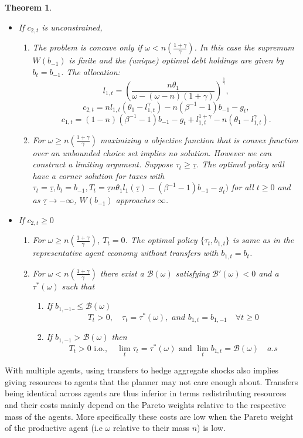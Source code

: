 \documentclass[thmsb,11pt]{article}
\newtheorem{theorem}{Theorem}
\begin{document}
\begin{theorem}
\begin{itemize}
\item If $c_{2,t}$ is unconstrained, 
\begin{enumerate}

\item The problem is concave only if $\omega<n \left(\frac{1+\gamma}{\gamma}\right)$. In this case the supremum $W(b_{-1})$ is finite and the (unique) optimal debt holdings are given by $b_{t}=b_{-1}$. The allocation:
\[l_{1,t}=\left(\frac{n\theta_1}{\omega-(\omega-n)(1+\gamma)}\right)^{\frac{1}{\gamma}},\]\[c_{2,t}=nl_{1,t}(\theta_1-l_{1,t}^{\gamma})-n (\beta^{-1}-1)b_{-1}-g_t,\]\[c_{1,t}=(1-n)(\beta^{-1}-1)b_{-1}-g_t+l_{1,t}^{1+\gamma}-n(\theta_1-l^{\gamma}_{1,t}).\]
\item For $\omega\geq n \left(\frac{1+\gamma}{\gamma}\right)$ maximizing  a objective function that is convex function over an unbounded choice set implies no solution. However we can construct a limiting argument. Suppose $\tau_t\geq \underline{\tau}$. The optimal policy will have a corner solution for taxes with $\tau_t=\underline{\tau},b_t=b_{-1}, T_t=\underline{\tau}n\theta_1 l_1(\underline{\tau})-(\beta^{-1}-1)b_{-1}-g_t)$ for all $t\geq 0$ and as $\underline{\tau}\to -\infty$, $W(b_{-1})$ approaches $\infty$.
\end{enumerate}
\item If $c_{2,t}\geq 0 $ 

\begin{enumerate}
 \item For $\omega\geq n \left(\frac{1+\gamma}{\gamma}\right)$,  $T_t=0$.  The optimal policy $\{\tau_t,b_{1,t}\}$ is same as in the representative agent economy without transfers with $b_{1,t}=b_t$.
   \item For $\omega< n \left(\frac{1+\gamma}{\gamma}\right)$ there exist  a $\mathcal{B}(\omega)$  satisfying $\mathcal{B}'(\omega)<0$ and a $\tau^*(\omega)$ such that
 \begin{enumerate}
  \item If $b_{1,-1}\_\leq \mathcal{B(\omega)}$
\[T_t>0, \quad \tau_t=\tau^*(\omega), \textit{ and } b_{1,t}=b_{1,-1} \quad \forall t \geq 0 \]
\item If $b_{1,-1}> \mathcal{B(\omega)}$ then
   \[ T_t>0 \text{ i.o.},\quad \lim_t\tau_t=\tau^*(\omega) \text{ and } \lim_tb_{1,t}=\mathcal{B}(\omega)\quad \textit{a.s}\]
\end{enumerate}

\end{enumerate}
 \end{itemize}

\end{theorem}
With multiple agents, using transfers to hedge aggregate shocks also implies giving resources to agents that the planner may not care enough about. Transfers being identical across agents are thus inferior in terms redistributing resources and their costs mainly depend on the Pareto weights relative to the respective mass of the agents. More specifically these costs are low when the Pareto weight of the productive agent (i.e $\omega$ relative to their mass $n$) is low.
\end{document}
